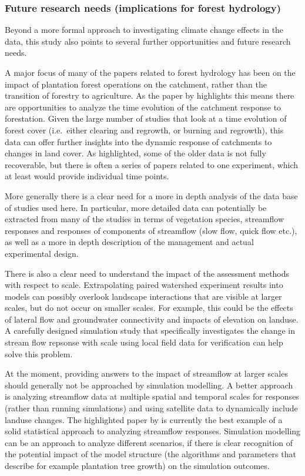 \documentclass[]{elsarticle} %
\begin{document}
\hypertarget{future-research-needs-implications-for-forest-hydrology}{%
\subsubsection{Future research needs (implications for forest hydrology)}\label{future-research-needs-implications-for-forest-hydrology}}

Beyond a more formal approach to investigating climate change effects in the data, this study also points to several further opportunities and future research needs.

A major focus of many of the papers related to forest hydrology has been on the impact of plantation forest operations on the catchment, rather than the transition of forestry to agriculture. As the paper by \citet{jones2017} highlights this means there are opportunities to analyze the time evolution of the catchment response to forestation. Given the large number of studies that look at a time evolution of forest cover (i.e.~either clearing and regrowth, or burning and regrowth), this data can offer further insights into the dynamic response of catchments to changes in land cover. As highlighted, some of the older data is not fully recoverable, but there is often a series of papers related to one experiment, which at least would provide individual time points.

More generally there is a clear need for a more in depth analysis of the data base of studies used here. In particular, more detailed data can potentially be extracted from many of the studies in terms of vegetation species, streamflow responses and responses of components of streamflow (slow flow, quick flow etc.), as well as a more in depth description of the management and actual experimental design.

There is also a clear need to understand the impact of the assessment methods with respect to scale. Extrapolating paired watershed experiment results into models can possibly overlook landscape interactions that are visible at larger scales, but do not occur on smaller scales. For example, this could be the effects of lateral flow and groundwater connectivity and impacts of elevation on landuse. A carefully designed simulation study that specifically investigates the change in stream flow repsonse with scale using local field data for verification can help solve this problem.

At the moment, providing answers to the impact of streamflow at larger scales should generally not be approached by simulation modelling. A better approach is analyzing streamflow data at multiple spatial and temporal scales for responses (rather than running simulations) and using satellite data to dynamically include landuse changes. The highlighted paper by \citet{levy2018} is currently the best example of a solid statistical approach to analyzing streamflow responses. Simulation modelling can be an approach to analyze different scenarios, if there is clear recognition of the potential impact of the model structure (the algorithms and parameters that describe for example plantation tree growth) on the simulation outcomes.
\end{document}
